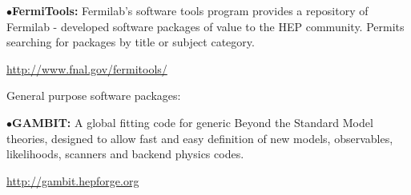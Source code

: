 \medskip

\item{$\bullet$}{\bf FermiTools:}
Fermilab's software tools program provides a repository of Fermilab - developed software packages of value to the HEP community. Permits searching for packages by title or subject category.
	\item{}\qquad\url{http://www.fnal.gov/fermitools/}

\medskip


General purpose software packages:



\item{$\bullet$}{\bf GAMBIT:}
A global fitting code for generic Beyond the Standard Model theories, designed to allow fast and easy definition of new models, observables, likelihoods, scanners and backend physics codes.
	\item{}\qquad\url{http://gambit.hepforge.org}






